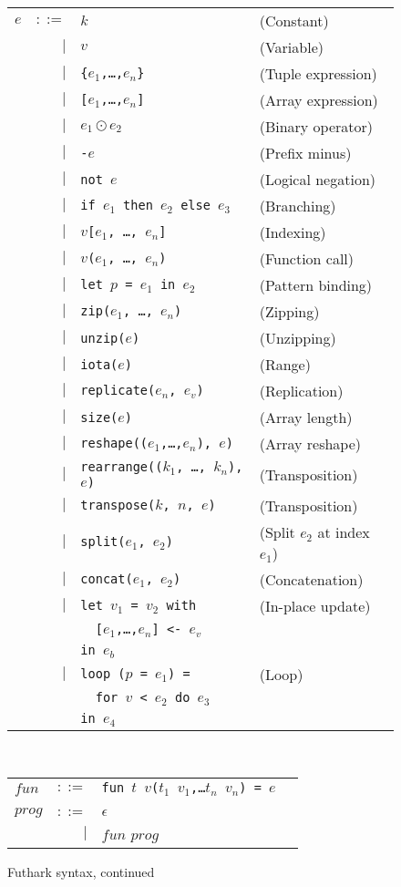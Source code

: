 \documentclass[oneside]{memoir}
\begin{document}
\begin{figure}[bt]
\begin{tabular}{lrll}
$e$ & $::=$ & $k$ & (Constant)\\
& $|$ & $v$ & (Variable)\\
& $|$ & \texttt{\{$e_{1}$,\ldots,$e_{n}$\}} & (Tuple expression) \\
& $|$ & \texttt{[$e_{1}$,\ldots,$e_{n}$]} & (Array expression) \\
& $|$ & $e_{1} \odot{} e_{2}$ & (Binary operator) \\
& $|$ & \texttt{-$e$} & (Prefix minus) \\
& $|$ & \texttt{not $e$} & (Logical negation) \\
& $|$ & \texttt{if $e_{1}$ then $e_{2}$ else $e_{3}$} & (Branching) \\
& $|$ & \texttt{$v$[$e_{1}$, \ldots, $e_{n}$]} & (Indexing) \\
& $|$ & \texttt{$v$($e_{1}$, \ldots, $e_{n}$)} & (Function call) \\
& $|$ & \texttt{let $p$ = $e_{1}$ in $e_{2}$} & (Pattern binding) \\
& $|$ & \texttt{zip($e_{1}$, \ldots, $e_{n}$)} & (Zipping) \\
& $|$ & \texttt{unzip($e$)} & (Unzipping) \\
& $|$ & \texttt{iota($e$)} & (Range) \\
& $|$ & \texttt{replicate($e_{n}$, $e_{v}$)} & (Replication) \\
& $|$ & \texttt{size($e$)} & (Array length) \\
& $|$ & \texttt{reshape(($e_{1}$,\ldots,$e_{n}$), $e$)} & (Array reshape) \\
& $|$ & \texttt{rearrange(($k_{1}$, \ldots, $k_{n}$), $e$)} & (Transposition) \\
& $|$ & \texttt{transpose($k$, $n$, $e$)} & (Transposition) \\
& $|$ & \texttt{split($e_{1}$, $e_{2}$)} & (Split $e_{2}$ at index $e_{1}$) \\
& $|$ & \texttt{concat($e_{1}$, $e_{2}$)} & (Concatenation) \\
& $|$ & \texttt{let $v_{1}$ = $v_{2}$ with} & (In-place update) \\
&     & \texttt{\ \ [$e_{1}$,\ldots,$e_{n}$] <- $e_{v}$} \\
&     & \texttt{in $e_{b}$} \\
& $|$ & \texttt{loop ($p$ = $e_{1}$) =} & (Loop) \\
&     & \texttt{\ \ for $v$ < $e_{2}$ do $e_{3}$} \\
&     & \texttt{in $e_{4}$} \\
\end{tabular}
\\
\begin{tabular}{lrll}
$fun$ & $::=$ & \texttt{fun $t$ $v$($t_{1}$ $v_{1}$,\ldots $t_{n}$ $v_{n}$) = $e$} \\
\\
$prog$ & $::=$ & $\epsilon$ \\
       & $|$   & $fun$ $prog$
\end{tabular}
\caption{Futhark syntax, continued}
\label{fig:fo-syntax-continued}
\end{figure}
\end{document}
